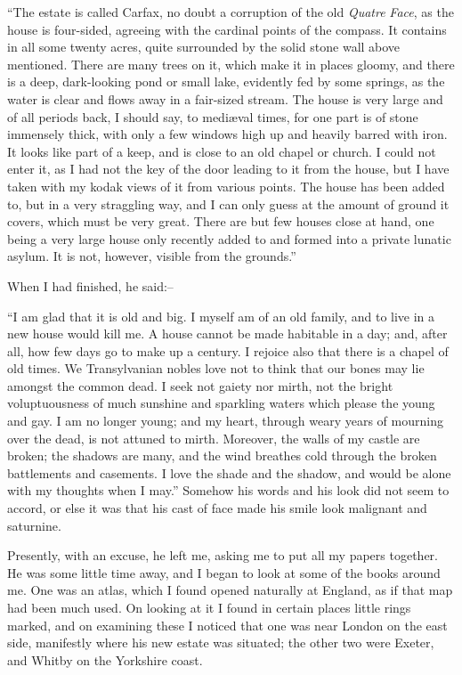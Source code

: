 \documentclass[12pt,openright]{book}
\begin{document}
“The estate is called Carfax, no doubt a corruption of the old \textit{Quatre}\textit{ }\textit{Face}, as the house is four-sided, agreeing with the cardinal points of the compass. It contains in all some twenty acres, quite surrounded by the solid stone wall above mentioned. There are many trees on it, which make it in places gloomy, and there is a deep, dark-looking pond or small lake, evidently fed by some springs, as the water is clear and flows away in a fair-sized stream. The house is very large and of all periods back, I should say, to mediæval times, for one part is of stone immensely thick, with only a few windows high up and heavily barred with iron. It looks like part of a keep, and is close to an old chapel or church. I could not enter it, as I had not the key of the door leading to it from the house, but I have taken with my kodak views of it from various points. The house has been added to, but in a very straggling way, and I can only guess at the amount of ground it covers, which must be very great. There are but few houses close at hand, one being a very large house only recently added to and formed into a private lunatic asylum. It is not, however, visible from the grounds.”

When I had finished, he said:–

“I am glad that it is old and big. I myself am of an old family, and to live in a new house would kill me. A house cannot be made habitable in a day; and, after all, how few days go to make up a century. I rejoice also that there is a chapel of old times. We Transylvanian nobles love not to think that our bones may lie amongst the common dead. I seek not gaiety nor mirth, not the bright voluptuousness of much sunshine and sparkling waters which please the young and gay. I am no longer young; and my heart, through weary years of mourning over the dead, is not attuned to mirth. Moreover, the walls of my castle are broken; the shadows are many, and the wind breathes cold through the broken battlements and casements. I love the shade and the shadow, and would be alone with my thoughts when I may.” Somehow his words and his look did not seem to accord, or else it was that his cast of face made his smile look malignant and saturnine.

Presently, with an excuse, he left me, asking me to put all my papers together. He was some little time away, and I began to look at some of the books around me. One was an atlas, which I found opened naturally at England, as if that map had been much used. On looking at it I found in certain places little rings marked, and on examining these I noticed that one was near London on the east side, manifestly where his new estate was situated; the other two were Exeter, and Whitby on the Yorkshire coast.
\end{document}
